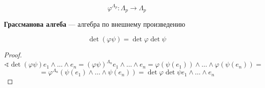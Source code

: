 \begin{remark}
    $$\varphi^{\Lambda_p} : \Lambda_p\to \Lambda_p$$
\end{remark}

\begin{definition}
    \textbf{Грассманова алгеба} --- алгебра по внешнему произведению
\end{definition}

\begin{theorem}
    $$\det (\varphi\psi) = \det \varphi\det \psi$$
\end{theorem}
\begin{proof}
    $$\sphericalangle \det(\varphi\psi)e_1\wedge\ldots\wedge e_n = (\varphi\psi)^{\Lambda_n}e_1\wedge\ldots\wedge e_n=\varphi(\psi(e_1))\wedge\ldots\wedge \varphi(\psi(e_n))=$$
    $$=\varphi^{\Lambda_n}(\psi(e_1)\wedge\ldots\wedge \psi(e_n))=\det \varphi\det \psi e_1\wedge\ldots\wedge e_n$$
\end{proof}




